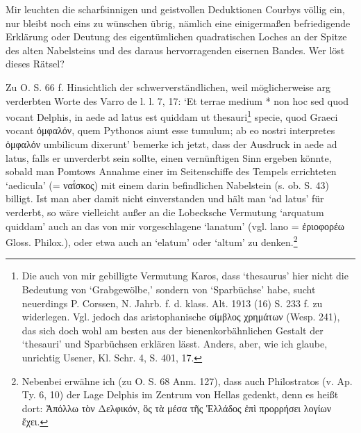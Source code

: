 \documentclass[a4paper, 11pt, oneside]{article}
\begin{document}
Mir leuchten die scharfsinnigen und geistvollen Deduktionen Courbys völlig ein, nur bleibt noch eins zu wünschen übrig, nämlich eine einigermaßen befriedigende Erklärung oder Deutung des eigentümlichen quadratischen Loches an der Spitze des alten Nabelsteins und des daraus hervorragenden eisernen Bandes. Wer löst dieses Rätsel?

Zu O. S. 66 f. Hinsichtlich der schwerverständlichen, weil möglicherweise arg verderbten Worte des Varro de l. l. 7, 17: `Et terrae medium * non hoc sed quod vocant Delphis, in aede ad latus est quiddam ut thesauri\footnote{Die auch von mir gebilligte Vermutung Karos, dass `thesaurus' hier nicht die Bedeutung von `Grabgewölbe,' sondern von `Sparbüchse' habe, sucht neuerdings P. Corssen, N. Jahrb. f. d. klass. Alt. 1913 (16) S. 233 f. zu widerlegen. Vgl. jedoch das aristophanische σίμβλος χρημάτων (Wesp. 241), das sich doch wohl am besten aus der bienenkorbähnlichen Gestalt der `thesauri' und Sparbüchsen erklären lässt. Anders, aber, wie ich glaube, unrichtig Usener, Kl. Schr. 4, S. 401, 17.} specie, quod Graeci vocant ὀμφαλόν, quem Pythonos aiunt esse tumulum; ab eo nostri interpretes ὀμφαλόν umbilicum dixerunt' bemerke ich jetzt, dass der Ausdruck in aede ad latus, falls er unverderbt sein sollte, einen vernünftigen Sinn ergeben könnte, sobald man Pomtows Annahme einer im Seitenschiffe des Tempels errichteten `aedicula' (= ναΐσκος) mit einem darin befindlichen Nabelstein (s. ob. S. 43) billigt. Ist man aber damit nicht einverstanden und hält man `ad latus' für verderbt, so wäre vielleicht außer an die Lobecksche Vermutung `arquatum quiddam' auch an das von mir vorgeschlagene `lanatum' (vgl. lano = ἐριοφορέω Gloss. Philox.), oder etwa auch an `elatum' oder `altum' zu denken.\footnote{Nebenbei erwähne ich (zu O. S. 68 Anm. 127), dass auch Philostratos (v. Ap. Ty. 6, 10) der Lage Delphis im Zentrum von Hellas gedenkt, denn es heißt dort: Ἀπόλλω τὸν Δελφικόν, ὃς τὰ μέσα τῆς Ἑλλάδος ἐπὶ προρρήσει λογίων ἔχει.}
\end{document}
